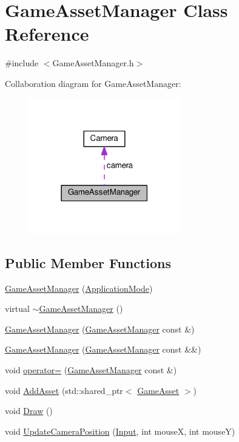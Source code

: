 \hypertarget{class_game_asset_manager}{}\section{Game\+Asset\+Manager Class Reference}
\label{class_game_asset_manager}


{\ttfamily \#include $<$Game\+Asset\+Manager.\+h$>$}



Collaboration diagram for Game\+Asset\+Manager\+:
\nopagebreak
\begin{figure}[H]
\begin{center}
\leavevmode
\includegraphics[width=186pt]{class_game_asset_manager__coll__graph}
\end{center}
\end{figure}
\subsection*{Public Member Functions}
\begin{DoxyCompactItemize}
\item 
\hyperlink{class_game_asset_manager_aaa0d58e276cc10ad91a7457085598a71}{Game\+Asset\+Manager} (\hyperlink{common_8h_add86e7c88dd109abea3f708b422f31f0}{Application\+Mode})
\item 
virtual \hyperlink{class_game_asset_manager_a1270bd61ecbcca563f079803e40c9b77}{$\sim$\+Game\+Asset\+Manager} ()
\item 
\hyperlink{class_game_asset_manager_a2c9adcb72faa154c87eadc9bafe5269d}{Game\+Asset\+Manager} (\hyperlink{class_game_asset_manager}{Game\+Asset\+Manager} const \&)
\item 
\hyperlink{class_game_asset_manager_a44f6e2fd6b8ff1dd64e5697f1be7386d}{Game\+Asset\+Manager} (\hyperlink{class_game_asset_manager}{Game\+Asset\+Manager} const \&\&)
\item 
void \hyperlink{class_game_asset_manager_ac72678a4ad5378c685aa6bae84a4e712}{operator=} (\hyperlink{class_game_asset_manager}{Game\+Asset\+Manager} const \&)
\item 
void \hyperlink{class_game_asset_manager_ad3de8ff00d55ba04728b1de8213b2349}{Add\+Asset} (std\+::shared\+\_\+ptr$<$ \hyperlink{class_game_asset}{Game\+Asset} $>$)
\item 
void \hyperlink{class_game_asset_manager_a32837132bd70a9a9ed537323c2d3d886}{Draw} ()
\item 
void \hyperlink{class_game_asset_manager_a2a2eeb7778b2955694cf2dd68f9daefb}{Update\+Camera\+Position} (\hyperlink{common_8h_a080a822f0093973313bd644e517a5090}{Input}, int mouse\+X, int mouse\+Y)
\end{DoxyCompactItemize}
